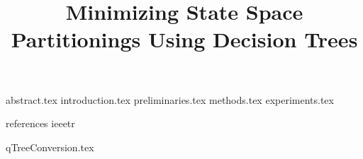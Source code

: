 \documentclass [
  letterpaper,
  10 pt,
  conference
] {ieeeconf}
\title {Minimizing State Space Partitionings Using Decision Trees}
\author {
  \authorblockN {Andreas Holck Høeg-Petersen}
  \authorblockA {Aalborg University\\ Denmark}
  \and
  \authorblockN {Kim Guldstrand Larsen}
  \authorblockA {Aalborg University\\ Denmark}
  \and
  \authorblockN {Peter Gjøl Jensen}
  \authorblockA {Aalborg University\\ Denmark}
  \and
  \authorblockN {Andrzej Wąsowski}
  \authorblockA {IT University of Copenhagen\\ Denmark}
}
\begin{document}
\maketitle

 {abstract.tex}
 {introduction.tex}
 {preliminaries.tex}
 {methods.tex}
 {experiments.tex}

\newpage

 {references}
 {ieeetr}

\appendix

 {qTreeConversion.tex}
\end{document}
